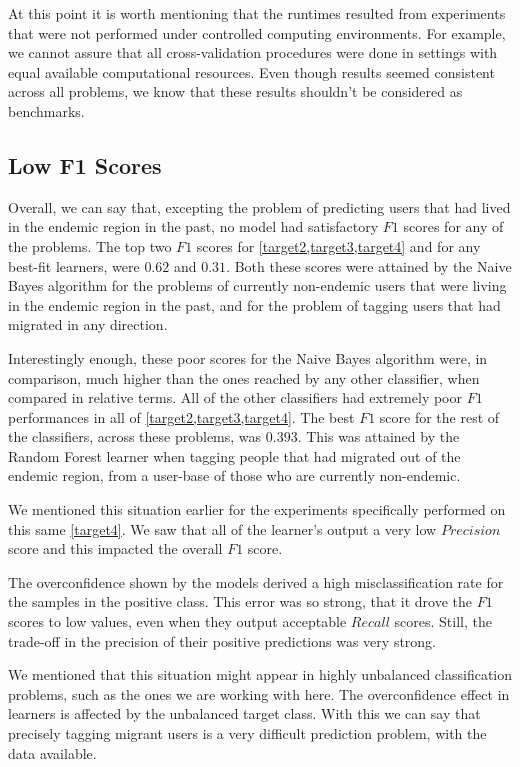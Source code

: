 At this point it is worth mentioning that the runtimes resulted from experiments that were not performed under controlled computing environments.
For example, we cannot assure that all cross-validation procedures were done in settings with equal available computational resources.
Even though results seemed consistent across all problems, we know that these results shouldn't be considered as benchmarks.


\subsection{Low F1 Scores}\label{subsec:master_table_low_f1}

Overall, we can say that, excepting the problem of predicting users that had lived in the endemic region in the past, no model had satisfactory $F1$ scores for any of the problems. The top two $F1$ scores for \cref{target2,target3,target4} and for any best-fit learners, were $0.62$ and $0.31$.
Both these scores were attained by the Naive Bayes algorithm for the problems of currently non-endemic users that were living in the endemic region in the past, and for the problem of tagging users that had migrated in any direction.

Interestingly enough, these poor scores for the Naive Bayes algorithm were, in comparison, much higher than the ones reached by any other classifier, when compared in relative terms.
All of the other classifiers had extremely poor $F1$ performances in all of \cref{target2,target3,target4}.
The best $F1$ score for the rest of the classifiers, across these problems, was $0.393$.
This was attained by the Random Forest learner when tagging people that had migrated out of the endemic region, from a user-base of those who are currently non-endemic.

We mentioned this situation earlier for the experiments specifically performed on this same \cref{target4}.
We saw that all of the learner's output a very low $Precision$ score and this impacted the overall $F1$ score.

The overconfidence shown by the models derived a high misclassification rate for the samples in the positive class.
This error was so strong, that it drove the $F1$ scores to low values, even when they output acceptable $Recall$ scores.
Still, the trade-off in the precision of their positive predictions was very strong.

We mentioned that this situation might appear in highly unbalanced classification problems, such as the ones we are working with here.
The overconfidence effect in learners is affected by the unbalanced target class.
With this we can say that precisely tagging migrant users is a very difficult prediction problem, with the data available.

